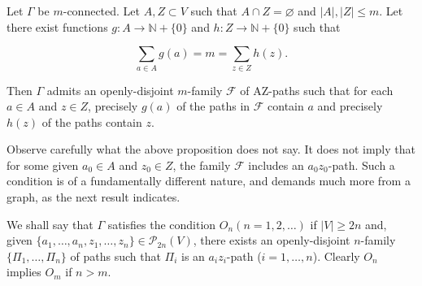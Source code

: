 Let $\Gamma$ be $m$-connected. Let $A, Z \subset V$ such that $A \cap Z = \varnothing$ and $|A|, |Z| \leq m$. Let there exist functions $g: A \rightarrow \mathbb{N} + \{0\}$ and $h: Z \rightarrow \mathbb{N} + \{0\}$ such that

$$\sum_{a \in A} g(a) = m = \sum_{z \in Z} h(z).$$

Then $\Gamma$ admits an openly-disjoint $m$-family $\mathcal{F}$ of AZ-paths such that for each $a \in A$ and $z \in Z$, precisely $g(a)$ of the paths in $\mathcal{F}$ contain $a$ and precisely $h(z)$ of the paths contain $z$.

Observe carefully what the above proposition does not say. It does not imply that for some given $a_0 \in A$ and $z_0 \in Z$, the family $\mathcal{F}$ includes an $a_0z_0$-path. Such a condition is of a fundamentally different nature, and demands much more from a graph, as the next result indicates.

We shall say that $\Gamma$ satisfies the condition $O_n (n = 1, 2, \ldots)$ if $|V| \geq 2n$ and, given $\{a_1, \ldots, a_n, z_1, \ldots, z_n\} \in \mathcal{P}_{2n}(V)$, there exists an openly-disjoint $n$-family $\{\Pi_1, \ldots, \Pi_n\}$ of paths such that $\Pi_i$ is an $a_iz_i$-path ($i = 1, \ldots, n$). Clearly $O_n$ implies $O_m$ if $n > m$.
